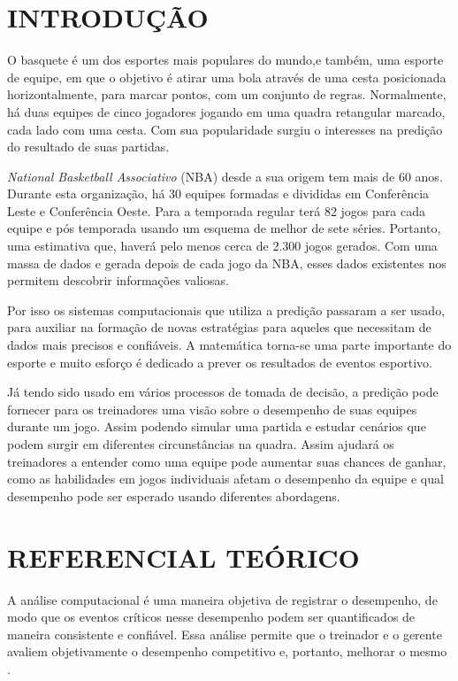 \newpage
\section{INTRODUÇÃO}


O basquete é um dos esportes mais populares do mundo,e também,	 uma esporte de equipe, em que o objetivo é atirar uma bola através de uma cesta posicionada horizontalmente, para marcar pontos, com um conjunto de regras. Normalmente, há duas equipes de cinco jogadores jogando em uma quadra retangular marcado, cada lado com uma cesta. Com sua popularidade surgiu o interesses na predição do resultado de suas partidas. 

\textit{National Basketball Associativo} (NBA) desde a sua origem tem mais de 60 anos. Durante esta organização, há 30 equipes formadas e divididas em Conferência Leste e Conferência Oeste. Para a temporada regular terá 82 jogos para cada equipe e pós temporada usando um esquema de melhor de sete séries. Portanto, uma estimativa que, haverá pelo menos cerca de 2.300 jogos gerados. Com uma massa de dados e gerada depois de cada jogo da NBA, esses dados existentes nos permitem descobrir informações valiosas.

Por isso os sistemas computacionais que utiliza a predição passaram a ser usado, para auxiliar na formação de novas estratégias para aqueles que necessitam de dados mais precisos e confiáveis. A matemática torna-se uma parte importante do esporte e muito esforço é dedicado a prever os resultados de eventos esportivo.

Já tendo sido usado em vários processos de tomada de decisão, a predição pode fornecer para os treinadores uma visão sobre o desempenho de suas equipes durante um jogo. Assim podendo simular uma partida e estudar cenários que podem surgir em diferentes circunstâncias na quadra. Assim ajudará os treinadores a entender como uma equipe pode aumentar suas chances de ganhar, como as habilidades em jogos individuais afetam o desempenho da equipe e qual desempenho pode ser esperado usando diferentes abordagens.


\section{REFERENCIAL TEÓRICO}
A análise computacional é uma maneira objetiva de registrar o desempenho, de modo que os eventos críticos nesse desempenho podem ser quantificados de maneira consistente e confiável. Essa análise permite que o treinador e o gerente avaliem objetivamente o desempenho competitivo e, portanto, melhorar o mesmo \cite{Taylor2004}. 

